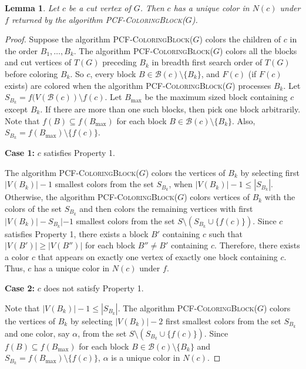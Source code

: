 \documentclass[11pt]{article}
\theoremstyle{plain}
\newtheorem{lemma}{Lemma}
\begin{document}
	\begin{lemma}\label{cut-vertex_unique}
		Let $c$ be a cut vertex of $G$. Then $c$ has a unique color in $N(c)$ under $f$ returned by the algorithm \textsc{PCF-ColoringBlock($G$)}.
	\end{lemma}
	\begin{proof}
		Suppose the algorithm \textsc{PCF-ColoringBlock($G$)} colors the children of $c$ in the order $B_1, \ldots, B_k$.
		The algorithm \textsc{PCF-ColoringBlock($G$)} colors all the blocks and cut vertices of $T(G)$ preceding $B_k$ in breadth first search order of $T(G)$ before coloring $B_k$. So $c$, every block $B\in \mathcal{B}(c)\setminus\{B_k\}$, and $F(c)$ (if $F(c)$ exists) are colored when the algorithm \textsc{PCF-ColoringBlock($G$)} processes $B_k$. 
		Let $S_{B_k} = f(V(\mathcal{B}(c))\setminus f(c)$. Let $B_{\max}$ be the maximum sized block containing $c$ except $B_k$. If there are more than one such blocks, then pick one block arbitrarily. Note that $f(B) \subseteq f(B_{\max})$ for each block $B\in \mathcal{B}(c)\setminus\{B_k\}$. Also, $S_{B_k} = f(B_{\max})\setminus \{f(c)\}$.
		
		\medskip
		\noindent\textbf{Case 1:} $c$ satisfies \textsf{Property 1}.
		
		\medskip
		The algorithm \textsc{PCF-ColoringBlock($G$)} colors the vertices of $B_k$ by selecting first $|V(B_k)|-1$ smallest colors from the set $S_{B_k}$, when $|V(B_k)|-1 \leq |S_{B_k}|$. Otherwise, the algorithm \textsc{PCF-ColoringBlock($G$)} colors vertices of $B_k$ with the colors of the set $S_{B_k}$ and then colors the remaining vertices with first $|V(B_k)|-S_{B_k}|-1$ smallest colors from the set $S\setminus (S_{B_k}\cup\{f(c)\})$. 
		Since $c$ satisfies \textsf{Property 1}, there exists a block $B'$ containing $c$ such that $|V(B')|\geq |V(B'')|$ for each block $B''\neq B'$ containing $c$. Therefore, there exists a color $c$ that appears on exactly one vertex of exactly one block containing $c$. Thus, $c$ has a unique color in $N(c)$ under $f$. 
		
		\medskip
		\noindent\textbf{Case 2:} $c$ does not satisfy \textsf{Property 1}.
		
		\medskip
		Note that $|V(B_k)|-1 \leq |S_{B_k}|$.
		The algorithm \textsc{PCF-ColoringBlock($G$)} colors the vertices of $B_k$ by selecting $|V(B_k)|-2$ first smallest colors from the set $S_{B_k}$ and one color, say $\alpha$, from the set $S\setminus (S_{B_k}\cup\{f(c)\})$. Since $f(B)\subseteq f(B_{\max})$ for each block $B\in \mathcal{B}(c)\setminus\{B_k\}$ and $S_{B_k} = f(B_{\max})\setminus \{f(c)\}$, $\alpha$ is a unique color in $N(c)$.
	\end{proof}
	
\end{document}
